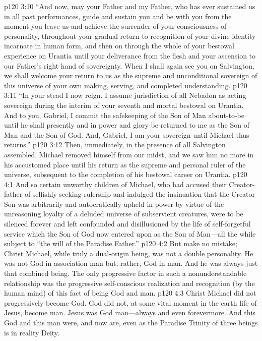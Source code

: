 \pc \vs p120 3:10 “And now, may your Father and my Father, who has ever sustained us in all past performances, guide and sustain you and be with you from the moment you leave us and achieve the surrender of your consciousness of personality, throughout your gradual return to recognition of your divine identity incarnate in human form, and then on through the whole of your bestowal experience on Urantia until your deliverance from the flesh and your ascension to our Father’s right hand of sovereignty. When I shall again see you on Salvington, we shall welcome your return to us as the supreme and unconditional sovereign of this universe of your own making, serving, and completed understanding.\plusone
\vs p120 3:11 “In your stead I now reign. I assume jurisdiction of all Nebadon as acting sovereign during the interim of your seventh and mortal bestowal on Urantia. And to you, Gabriel, I commit the safekeeping of the Son of Man about\hyp{}to\hyp{}be until he shall presently and in power and glory be returned to me as the Son of Man and the Son of God. And, Gabriel, I am your sovereign until Michael thus returns.”
\separatorshort
\vs p120 3:12 Then, immediately, in the presence of all Salvington assembled, Michael removed himself from our midst, and we saw him no more in his accustomed place until his return as the supreme and personal ruler of the universe, subsequent to the completion of his bestowal career on Urantia.
\vs p120 4:1 And so certain unworthy children of Michael, who had accused their Creator\hyp{}father of selfishly seeking rulership and indulged the insinuation that the Creator Son was arbitrarily and autocratically upheld in power by virtue of the unreasoning loyalty of a deluded universe of subservient creatures, were to be silenced forever and left confounded and disillusioned by the life of self\hyp{}forgetful service which the Son of God now entered upon as the Son of Man---all the while subject to “the will of the Paradise Father.”
\pc \vs p120 4:2 But make no mistake; Christ Michael, while truly a dual\hyp{}origin being, was not a double personality. He was not God in association  man but, rather, God  in man. And he was always just that combined being. The only progressive factor in such a nonunderstandable relationship was the progressive self\hyp{}conscious realization and recognition (by the human mind) of this fact of being God and man.
\vs p120 4:3 Christ Michael did not progressively become God. God did not, at some vital moment in the earth life of Jesus, become man. Jesus was God  man---always and even forevermore. And this God and this man were, and now are,  even as the Paradise Trinity of three beings is in reality  Deity.\plusone
